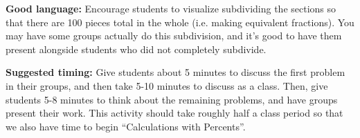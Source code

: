 \documentclass[nooutcomes,noauthor,handout]{ximera}
\begin{document}
\begin{instructorNotes}
{\bf Good language:}  Encourage students to visualize subdividing the sections so that there are 100 pieces total in the whole (i.e. making equivalent fractions).  You may have some groups actually do this subdivision, and it's good to have them present alongside students who did not completely subdivide.


{\bf Suggested timing:} Give students about 5 minutes to discuss the first problem in their groups, and then take 5-10 minutes to discuss as a class. Then, give students 5-8 minutes to think about the remaining problems, and have groups present their work. This activity should take roughly half a class period so that we also have time to begin ``Calculations with Percents''.

\end{instructorNotes}
\end{document}
